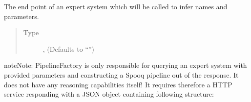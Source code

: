 \documentclass[a4paper,10pt, twoside,english]{sphinxmanual}
\begin{document}
\begin{fulllineitems}
\begin{fulllineitems}
\label{\detokenize{pipeline/pipeline_factory:spooq2.pipeline.factory.PipelineFactory.url}}
The end point of an expert system which will be called to infer names and parameters.
\begin{quote}\begin{description}
\item[{Type}] \leavevmode
{}, (Defaults to “”)

\end{description}\end{quote}

\end{fulllineitems}


\begin{sphinxadmonition}{note}{Note:}
PipelineFactory is only responsible for querying an expert system with provided parameters
and constructing a Spooq pipeline out of the response. It does not have any reasoning capabilities
itself! It requires therefore a HTTP service responding with a JSON object containing following structure:


\end{sphinxadmonition}
\end{fulllineitems}
\end{document}
